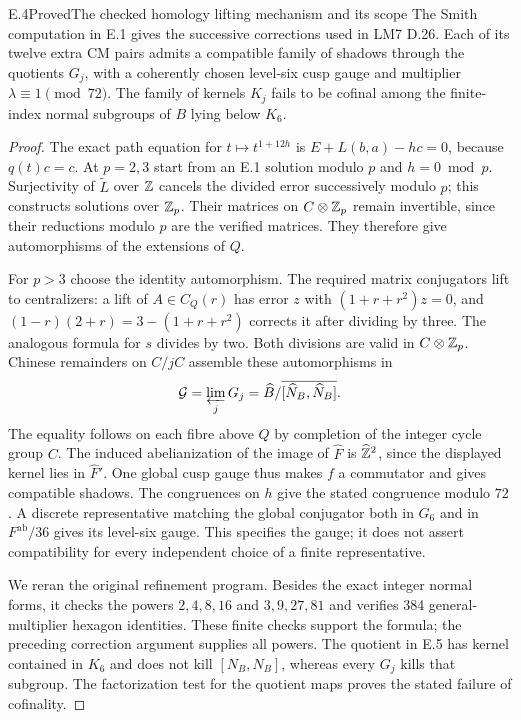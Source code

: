 \begin{statement}{E.4}{Proved}{The checked homology lifting mechanism and its scope}
The Smith computation in E.1 gives the successive corrections used in
LM7 D.26. Each of its twelve extra CM pairs admits a compatible family
of shadows through the quotients $G_j$, with a coherently chosen
level-six cusp gauge and multiplier $\lambda\equiv1\pmod{72}$.
The family of kernels $K_j$ fails to be cofinal among the finite-index
normal subgroups of $B$ lying below $K_6$.
\end{statement}
\begin{proof}
The exact path equation for $t\mapsto t^{1+12h}$ is
$E+L(b,a)-hc=0$, because $q(t)c=c$. At $p=2,3$ start from an E.1
solution modulo $p$ and $h=0\bmod p$. Surjectivity of $\widetilde L$
over $\mathbb Z$ cancels the divided error successively modulo $p$; this
constructs solutions over $\mathbb Z_p$. Their matrices on $C\otimes\mathbb Z_p$
remain invertible, since their reductions modulo $p$ are the verified
matrices. They therefore give automorphisms of the extensions of $Q$.

For $p>3$ choose the identity automorphism. The required matrix
conjugators lift to centralizers: a lift of $A\in C_Q(r)$ has error
$z$ with $(1+r+r^2)z=0$, and
$(1-r)(2+r)=3-(1+r+r^2)$ corrects it after dividing by three.
The analogous formula for $s$ divides by two. Both divisions are
valid in $C\otimes\mathbb Z_p$. Chinese remainders on $C/jC$ assemble these
automorphisms in
\[
 \mathcal G=\varprojlim_j G_j
   =\widehat B/\overline{[\widehat N_B,\widehat N_B]}.
\]
The equality follows on each fibre above $Q$ by completion of the
integer cycle group $C$. The induced abelianization of the image of
$\widehat F$ is $\widehat{\mathbb Z}^2$, since the displayed kernel lies in
$\widehat F'$. One global cusp gauge thus makes $f$ a commutator
and gives compatible shadows. The congruences on $h$ give the stated
congruence modulo $72$. A discrete representative matching the global
conjugator both in $G_6$ and in $F^{\mathrm{ab}}/36$ gives its level-six
gauge. This specifies the gauge; it does not assert compatibility for
every independent choice of a finite representative.

We reran the original refinement program. Besides the exact integer
normal forms, it checks the powers $2,4,8,16$ and $3,9,27,81$ and
verifies 384 general-multiplier hexagon identities. These finite
checks support the formula; the preceding correction argument supplies
all powers. The quotient in E.5 has kernel contained in $K_6$ and
does not kill $[N_B,N_B]$, whereas every $G_j$ kills that subgroup.
The factorization test for the quotient maps proves the stated
failure of cofinality.
\end{proof}

